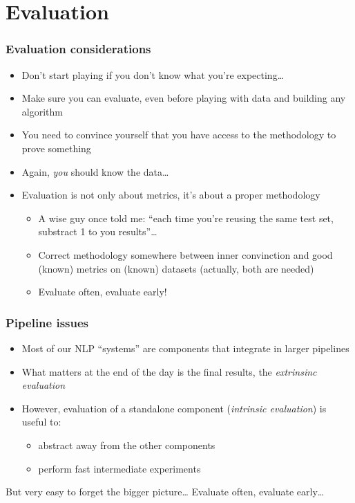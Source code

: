 \documentclass[usenames,dvipsnames]{beamer}
\newcommand{\voc}[1]{\emph{\color{ForestGreen}#1}}
\begin{document}
\section{Evaluation}
\begin{frame}\frametitle{Evaluation considerations}
\begin{itemize}
\item Don't start playing if you don't know what you're
  expecting\ldots
\item Make sure you can evaluate, even before playing with data and building any algorithm
\item You need to convince yourself that you have access to the
  methodology to prove something
\item Again, \emph{you} should know the data\ldots
\item Evaluation is not only about metrics, it's about a proper methodology
\begin{itemize}
\item A wise guy once told me: ``each time you're reusing the same test set,
substract 1 to you results''\ldots
\item Correct methodology somewhere between inner convinction and good
  (known) metrics on (known) datasets (actually, both are needed) \pause
\item Evaluate often, evaluate early!
\end{itemize}
\end{itemize}

\end{frame}

\begin{frame}\frametitle{Pipeline issues}

\begin{itemize}
\item Most of our NLP ``systems'' are components that integrate in larger
pipelines
\item What matters at the end of the day is the final results, the \voc{extrinsinc
evaluation}
\item However, evaluation of a standalone component (\voc{intrinsic
    evaluation}) is useful to:
\begin{itemize}
\item abstract away from the other components
\item perform fast intermediate experiments
\end{itemize}
\end{itemize}

\vspace{0.4cm}
But very easy to forget the bigger picture\ldots
\pause
\vspace{0.4cm}
Evaluate often, evaluate early\ldots
\end{frame}
\end{document}
